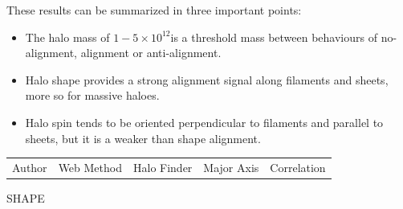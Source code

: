 \documentclass[useAMS,usenatbib]{mn2e}
\newcommand{\hMsun}{{\ifmmode{h^{-1}{\rm
        {M_{\odot}}}}\else{$h^{-1}{\rm{M_{\odot}}}$~}\fi}}
\begin{document}
These results can be summarized in three important points:
\begin{itemize}
\item The halo mass of $1-5\times 10^{12}$\hMsun is a threshold mass between
behaviours of no-alignment, alignment or anti-alignment.
\item Halo shape provides a strong alignment signal along filaments
  and sheets, more so for massive haloes. 
\item Halo spin tends to be oriented perpendicular to filaments and
parallel to sheets, but it is a weaker than shape alignment. 
\end{itemize}



\begin{table}
\begin{tabular}{lllll}
Author & Web Method & Halo Finder & Major Axis & Correlation\\
\end{tabular}
SHAPE
\end{table}
\end{document}
